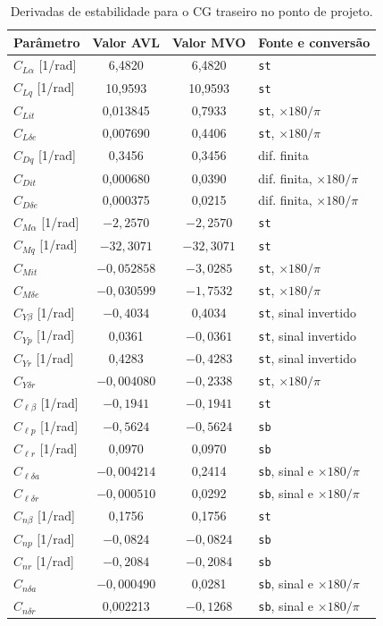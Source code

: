 \begin{table}[H]
\centering
\caption{Derivadas de estabilidade para o CG traseiro no ponto de projeto.}\label{tab:derivadas}
\renewcommand{\arraystretch}{1.15}
\begin{tabular}{lccl}
\toprule
Parâmetro & Valor AVL & Valor MVO & Fonte e conversão \\
\midrule
$C_{L\alpha}$ [1/rad] & 6,4820 & 6,4820 & \texttt{st} \\
$C_{Lq}$ [1/rad] & 10,9593 & 10,9593 & \texttt{st} \\
$C_{Lit}$ & 0,013845 & 0,7933 & \texttt{st}, $\times 180/\pi$ \\
$C_{L\delta e}$ & 0,007690 & 0,4406 & \texttt{st}, $\times 180/\pi$ \\
$C_{Dq}$ [1/rad] & 0,3456 & 0,3456 & dif. finita \\
$C_{Dit}$ & 0,000680 & 0,0390 & dif. finita, $\times 180/\pi$ \\
$C_{D\delta e}$ & 0,000375 & 0,0215 & dif. finita, $\times 180/\pi$ \\
$C_{M\alpha}$ [1/rad] & $-2{,}2570$ & $-2{,}2570$ & \texttt{st} \\
$C_{Mq}$ [1/rad] & $-32{,}3071$ & $-32{,}3071$ & \texttt{st} \\
$C_{Mit}$ & $-0{,}052858$ & $-3{,}0285$ & \texttt{st}, $\times 180/\pi$ \\
$C_{M\delta e}$ & $-0{,}030599$ & $-1{,}7532$ & \texttt{st}, $\times 180/\pi$ \\
$C_{Y\beta}$ [1/rad] & $-0{,}4034$ & 0,4034 & \texttt{st}, sinal invertido \\
$C_{Yp}$ [1/rad] & 0,0361 & $-0{,}0361$ & \texttt{st}, sinal invertido \\
$C_{Yr}$ [1/rad] & 0,4283 & $-0{,}4283$ & \texttt{st}, sinal invertido \\
$C_{Y\delta r}$ & $-0{,}004080$ & $-0{,}2338$ & \texttt{st}, $\times 180/\pi$ \\
$C_{\ell\beta}$ [1/rad] & $-0{,}1941$ & $-0{,}1941$ & \texttt{st} \\
$C_{\ell p}$ [1/rad] & $-0{,}5624$ & $-0{,}5624$ & \texttt{sb} \\
$C_{\ell r}$ [1/rad] & 0,0970 & 0,0970 & \texttt{sb} \\
$C_{\ell\delta a}$ & $-0{,}004214$ & 0,2414 & \texttt{sb}, sinal e $\times 180/\pi$ \\
$C_{\ell\delta r}$ & $-0{,}000510$ & 0,0292 & \texttt{sb}, sinal e $\times 180/\pi$ \\
$C_{n\beta}$ [1/rad] & 0,1756 & 0,1756 & \texttt{st} \\
$C_{np}$ [1/rad] & $-0{,}0824$ & $-0{,}0824$ & \texttt{sb} \\
$C_{nr}$ [1/rad] & $-0{,}2084$ & $-0{,}2084$ & \texttt{sb} \\
$C_{n\delta a}$ & $-0{,}000490$ & 0,0281 & \texttt{sb}, sinal e $\times 180/\pi$ \\
$C_{n\delta r}$ & 0,002213 & $-0{,}1268$ & \texttt{sb}, sinal e $\times 180/\pi$ \\
\bottomrule
\end{tabular}
\end{table}

